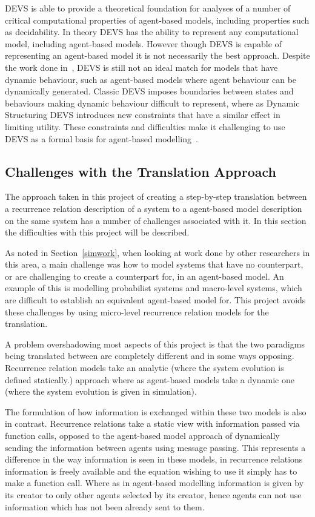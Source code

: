 \documentclass{article}
\begin{document}
DEVS is able to provide a theoretical foundation for analyses of a number of critical computational properties of agent-based models, including properties such as decidability. In theory DEVS has the ability to represent any computational model, including agent-based models. However though DEVS is capable of representing an agent-based model it is not necessarily the best approach. Despite the work done in~\cite{dynamicdevs}, DEVS is still not an ideal match for models that have dynamic behaviour, such as agent-based models where agent behaviour can be dynamically generated. Classic DEVS imposes boundaries between states and behaviours making dynamic behaviour difficult to represent, where as Dynamic Structuring DEVS introduces new constraints that have a similar effect in limiting utility. These constraints and difficulties make it challenging to use DEVS as a formal basis for agent-based modelling~\cite{taabm}.  






\subsection{Challenges with the Translation Approach} \label{twoviewsapproach} 
The approach taken in this project of creating a step-by-step translation between a recurrence relation description of a system to a agent-based model description on the same system has a number of challenges associated with it. In this section the difficulties with this project will be described. 

As noted in Section~\ref{simwork}, when looking at work done by other researchers in this area, a main challenge was how to model systems that have no counterpart, or are challenging to create a counterpart for, in an agent-based model.
An example of this is modelling probabilist systems and macro-level systems, which are difficult to establish an equivalent agent-based model for. This project avoids these challenges by using micro-level recurrence relation models for the translation. 

A problem overshadowing most aspects of this project is that the two paradigms being translated between are completely different and in some ways opposing. Recurrence relation models take an analytic (where the system evolution is defined statically.) approach where as agent-based models take a dynamic one (where the system evolution is given in simulation).  %

The formulation of how information is exchanged within these two models is also in contrast. Recurrence relations take a static view with information passed via function calls, opposed to the agent-based model approach of dynamically sending the information between agents using message passing. This represents a difference in the way information is seen in these models, in recurrence relations information is freely available and the equation wishing to use it simply has to make a function call. Where as in agent-based modelling information is given by its creator to only other agents selected by its creator, hence agents can not use information which has not been already sent to them.
\end{document}

